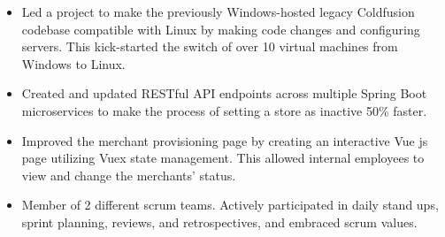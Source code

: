\documentclass[10pt,a4paper,ragged2e]{altacv}
\begin{document}

\begin{fullwidth}
\makecvheader
\end{fullwidth}



\begin{itemize}
\item Led a project to make the previously Windows-hosted legacy Coldfusion codebase compatible with Linux by making code changes and configuring servers. This kick-started the switch of over 10 virtual machines from Windows to Linux.

\smallskip
\item Created and updated RESTful API endpoints across multiple Spring Boot microservices to make the process of setting a store as inactive 50\% faster.
\smallskip
\item Improved the merchant provisioning page by creating an interactive Vue js page utilizing Vuex state management. This allowed internal employees to view and change the merchants' status.
\smallskip
\item Member of 2 different scrum teams. Actively participated in daily stand ups, sprint planning, reviews, and retrospectives, and embraced scrum values.
\end{itemize}
\end{document}
